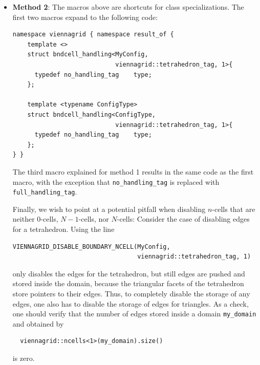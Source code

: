 \begin{itemize}
 \item \textbf{Method 2}: The macros above are shortcuts for class specializations. The first two macros expand to the following code:
\begin{lstlisting}
namespace viennagrid { namespace result_of {
    template <>
    struct bndcell_handling<MyConfig,
                            viennagrid::tetrahedron_tag, 1>{
      typedef no_handling_tag    type;
    };

    template <typename ConfigType>
    struct bndcell_handling<ConfigType,
                            viennagrid::tetrahedron_tag, 1>{
      typedef no_handling_tag    type;
    };
} }
\end{lstlisting}
The third macro explained for method 1 results in the same code as the first macro, with the exception that \lstinline|no_handling_tag| is replaced with \lstinline|full_handling_tag|.

Finally, we wish to point at a potential pitfall when disabling $n$-cells that are neither $0$-cells, $N-1$-cells, nor $N$-cells: Consider the case of disabling edges for a tetrahedron. Using the line
  \begin{lstlisting}
VIENNAGRID_DISABLE_BOUNDARY_NCELL(MyConfig,
                                  viennagrid::tetrahedron_tag, 1)
  \end{lstlisting}
only disables the edges for the tetrahedron, but still edges are pushed and stored inside the domain, because the triangular facets of the tetrahedron store pointers to their edges. Thus, to completely disable the storage of any edges, one also has to disable the storage of edges for triangles. As a check, one should verify that the number of edges stored inside a domain \lstinline|my_domain| and obtained by 
 \begin{lstlisting}
  viennagrid::ncells<1>(my_domain).size()
 \end{lstlisting}
is zero.



\end{itemize}
